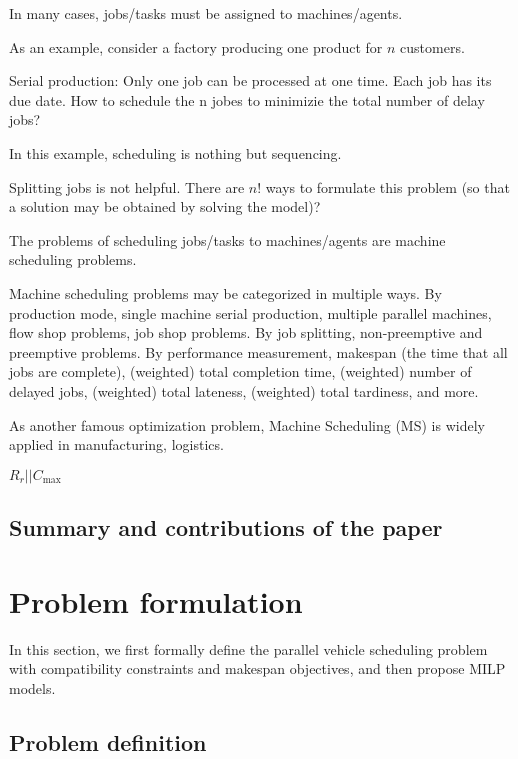 \documentclass[preprint,12pt,authoryear]{elsarticle}
\begin{document}
In many cases, jobs/tasks must be assigned to machines/agents.

As an example, consider a factory producing one product for $n$ customers. 

Serial production: Only one job can be processed at one time.
Each job has its due date.
How to schedule the n jobes to minimizie the total number of delay jobs?

In this example, scheduling is nothing but sequencing.

Splitting jobs is not helpful.
There are $n!$ ways to formulate this problem 
(so that a solution may be obtained by solving the model)?

The problems of scheduling jobs/tasks to 
machines/agents are machine scheduling problems.

Machine scheduling problems may be categorized in multiple ways. 
By production mode, 
single machine serial production, 
multiple parallel machines, 
flow shop problems,
job shop problems.
By job splitting,
non-preemptive and preemptive problems.
By performance measurement, 
makespan (the time that all jobs are complete),
(weighted) total completion time,
(weighted) number of delayed jobs,
(weighted) total lateness,
(weighted) total tardiness,
and more.


As another famous optimization problem, Machine Scheduling (MS) 
is widely applied in manufacturing, logistics.

$R_r||C_{\max}$                                                                                                                                                      

\subsection{Summary and contributions of the paper}

\section{Problem formulation}

In this section, we first formally define the parallel vehicle scheduling problem 
with compatibility constraints and makespan objectives, 
and then propose MILP models.

\subsection{Problem definition}
\end{document}
